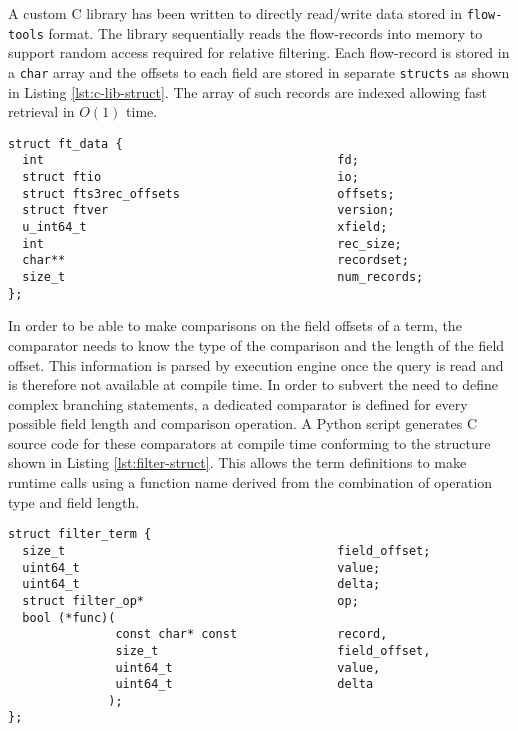 A custom C library has been written to directly read/write data stored in
\texttt{flow-tools} format. The library sequentially reads the flow-records
into memory to support random access required for relative filtering. Each
flow-record is stored in a \texttt{char} array and the offsets to each field
are stored in separate \texttt{structs} as shown in Listing
\ref{lst:c-lib-struct}. The array of such records are indexed allowing fast
retrieval in $O(1)$ time.

\begin{lstlisting}
struct ft_data {
  int                                         fd;
  struct ftio                                 io;
  struct fts3rec_offsets                      offsets;
  struct ftver                                version;
  u_int64_t                                   xfield;
  int                                         rec_size;
  char**                                      recordset;
  size_t                                      num_records;
};
\end{lstlisting}

In order to be able to make comparisons on the field offsets of a term, the
comparator needs to know the type of the comparison and the length of the
field offset. This information is parsed by execution engine once the query is
read and is therefore not available at compile time.  In order to subvert the
need to define complex branching statements, a dedicated comparator is defined
for every possible field length and comparison operation. A Python script
generates C source code for these comparators at compile time conforming to
the structure shown in Listing \ref{lst:filter-struct}. This allows the term
definitions to make runtime calls using a function name derived from the
combination of operation type and field length.

\begin{lstlisting}
struct filter_term {
  size_t                                      field_offset;
  uint64_t                                    value;
  uint64_t                                    delta;
  struct filter_op*                           op;
  bool (*func)(
               const char* const              record,
               size_t                         field_offset,
               uint64_t                       value,
               uint64_t                       delta
              );
};
\end{lstlisting}

